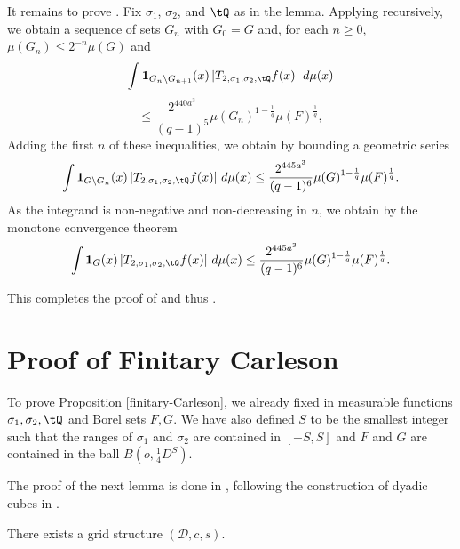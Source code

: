 It remains to prove .
Fix $\sigma_1$, $\sigma_2$,
and $\tQ$ as in the lemma.
Applying  recursively, we obtain
a sequence of sets $G_n$ with $G_0=G$ and,
for each $n\ge 0$, $\mu(G_{n})\le 2^{-n} \mu(G)$ and
\begin{equation*}
    \int \mathbf{1}_{G_{n}\setminus G_{n+1}}(x)
    \left| {T}_{2,\sigma_1,\sigma_2, \tQ} f(x) \right|\, d\mu(x)
\end{equation*}
\begin{equation}
    \le \frac{2^{440a^3}}{(q-1)^5} \mu(G_n)^{1 - \frac{1}{q}} \mu(F)^{\frac{1}{q}},
\end{equation}
Adding the first $n$ of these inequalities, we obtain by bounding a geometric series
    \begin{equation} \label{Sqcut2}
    \int \mathbf{1}_{G\setminus G_{n}}(x)
\left| {T}_{2,\sigma_1,\sigma_2, \tQ}f(x) \right|\, d\mu(x)
\le \frac{2^{445a^3}}{(q-1)^6} \mu(G)^{1-\frac{1}{q}} \mu(F)^{\frac{1}{q}}.
\end{equation}
As the integrand is non-negative and non-decreasing in $n$, we obtain by the monotone convergence theorem
 \begin{equation} \label{Sqcut3}
    \int \mathbf{1}_{G}(x)
\left| {T}_{2,\sigma_1,\sigma_2, \tQ}f(x) \right|\, d\mu(x)
\le \frac{2^{445a^3}}{(q-1)^6} \mu(G)^{1-\frac{1}{q}} \mu(F)^{\frac{1}{q}}.
\end{equation}



This completes the proof of 
and thus .

\chapter{Proof of Finitary Carleson}
\label{christsection}

To prove Proposition
\ref{finitary-Carleson}, we already fixed in 
measurable functions ${\sigma_1},\sigma_2, \tQ$ and Borel sets $F,G$. We have also
defined $S$ to be the smallest
integer such that the ranges of
$\sigma_1$ and $\sigma_2$ are contained in $[-S,S]$ and $F$ and $G$ are contained
in the ball $B(o, \frac 14 D^S)$.


The proof of the next lemma is done in ,
following the construction of dyadic cubes in \cite[\S 3]{christ1990b}.

\begin{lemma}
    \label{grid-existence}
    \leanok
     There exists a grid structure $(\mathcal{D}, c,s)$.
\end{lemma}




